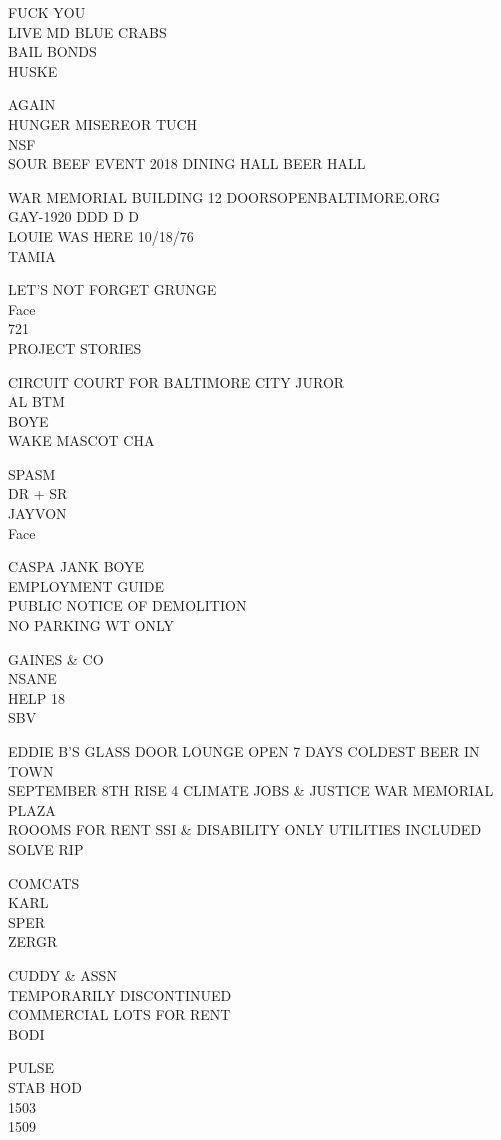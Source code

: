\documentclass[10pt,letterpaper]{article}
\begin{document}
FUCK YOU\\
LIVE MD BLUE CRABS\\
BAIL BONDS\\
HUSKE

AGAIN\\
HUNGER MISEREOR TUCH\\
NSF\\
SOUR BEEF EVENT 2018 DINING HALL BEER HALL

WAR MEMORIAL BUILDING 12 DOORSOPENBALTIMORE.ORG\\
GAY{-}1920 DDD D D\\
LOUIE WAS HERE 10/18/76\\
TAMIA

LET'S NOT FORGET GRUNGE\\
Face\\
721\\
PROJECT STORIES

CIRCUIT COURT FOR BALTIMORE CITY JUROR\\
AL BTM\\
BOYE\\
WAKE MASCOT CHA

SPASM\\
DR + SR\\
JAYVON\\
Face

CASPA JANK BOYE\\
EMPLOYMENT GUIDE\\
PUBLIC NOTICE OF DEMOLITION\\
NO PARKING WT ONLY

GAINES \& CO\\
NSANE\\
HELP 18\\
SBV

EDDIE B'S GLASS DOOR LOUNGE OPEN 7 DAYS COLDEST BEER IN TOWN\\
SEPTEMBER 8TH RISE 4 CLIMATE JOBS \& JUSTICE WAR MEMORIAL PLAZA\\
ROOOMS FOR RENT SSI \& DISABILITY ONLY UTILITIES INCLUDED\\
SOLVE RIP

COMCATS\\
KARL\\
SPER\\
ZERGR

CUDDY \& ASSN\\
TEMPORARILY DISCONTINUED\\
COMMERCIAL LOTS FOR RENT\\
BODI

PULSE\\
STAB HOD\\
1503\\
1509
\end{document}
